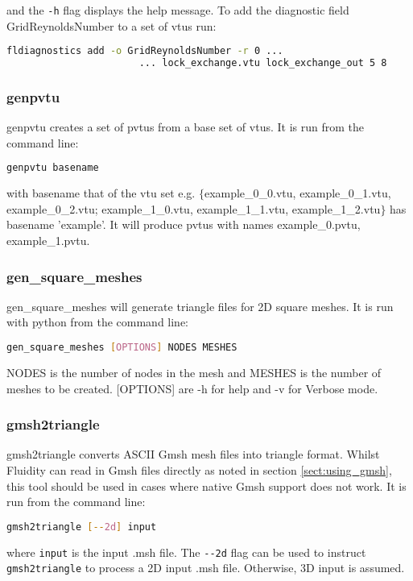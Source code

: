 and the \lstinline[language = Bash]+-h+ flag displays the help message. To add the diagnostic field GridReynoldsNumber to a set of vtus run:

\begin{lstlisting}[language = Bash]
fldiagnostics add -o GridReynoldsNumber -r 0 ...
			           ... lock_exchange.vtu lock_exchange_out 5 8
\end{lstlisting}


\subsubsection{genpvtu}
\label{sect:genpvtu}
genpvtu creates a set of pvtus from a base set of vtus. It is run from the command line:
\begin{lstlisting}[language = Bash]
genpvtu basename 
\end{lstlisting}
with basename that of the vtu set e.g. $\{$example\_0\_0.vtu, example\_0\_1.vtu, example\_0\_2.vtu; example\_1\_0.vtu, example\_1\_1.vtu, example\_1\_2.vtu$\}$ has basename 'example'. It will produce pvtus with names example\_0.pvtu, example\_1.pvtu.


\subsubsection{gen\_square\_meshes}
\label{sect:gen_square_meshes}
gen\_square\_meshes will generate triangle files for 2D square meshes. It is run with python from the command line:
\begin{lstlisting}[language = Bash]
gen_square_meshes [OPTIONS] NODES MESHES 
\end{lstlisting} 
NODES is the number of nodes in the mesh and MESHES is the number of meshes to be created. [OPTIONS] are -h for help and -v for Verbose mode.


\subsubsection{gmsh2triangle}
\label{sect:gmsh2triangle}
gmsh2triangle converts ASCII Gmsh mesh files into triangle format. Whilst Fluidity
can read in Gmsh files directly as noted in section \ref{sect:using_gmsh}, 
this tool should be used in cases where native Gmsh support does not work.
It is run from the command line:
\begin{lstlisting}[language = Bash]
gmsh2triangle [--2d] input
\end{lstlisting}
where \lstinline[language = Bash]+input+ is the input .msh file.
The \lstinline[language = Bash]+--2d+ flag can be used to instruct \lstinline+gmsh2triangle+
to process a 2D input .msh file. Otherwise, 3D input is assumed.

